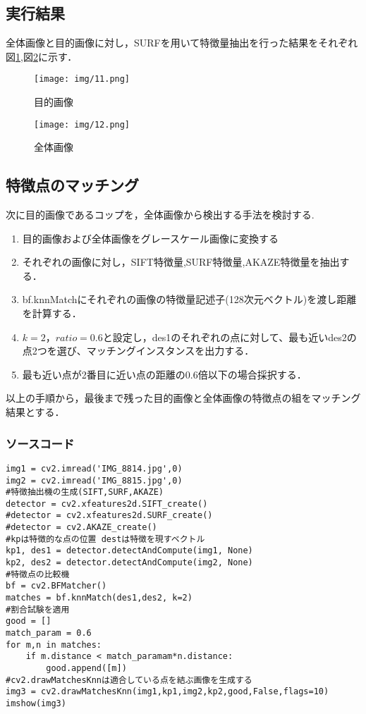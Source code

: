 \documentclass{article}
\begin{document}
\subsection{実行結果}
全体画像と目的画像に対し，SURFを用いて特徴量抽出を行った結果をそれぞれ図\ref{11},図\ref{12}に示す．

\begin{figure}[H]
    \centering
    \texttt{[image: img/11.png]}
    \caption{目的画像}
    \label{11}
\end{figure}

\begin{figure}[H]
    \centering
    \texttt{[image: img/12.png]}
    \caption{全体画像}
    \label{12}
\end{figure}


\subsection{特徴点のマッチング}
次に目的画像であるコップを，全体画像から検出する手法を検討する.

\begin{enumerate}
    \item 目的画像および全体画像をグレースケール画像に変換する
    \item それぞれの画像に対し，SIFT特徴量,SURF特徴量,AKAZE特徴量を抽出する．
    \item bf.knnMatchにそれぞれの画像の特徴量記述子(128次元ベクトル)を渡し距離を計算する．
    \item $k=2$，$ratio=0.6$と設定し，des1のそれぞれの点に対して、最も近いdes2の点2つを選び、マッチングインスタンスを出力する．
    \item 最も近い点が2番目に近い点の距離の0.6倍以下の場合採択する．
\end{enumerate}

以上の手順から，最後まで残った目的画像と全体画像の特徴点の組をマッチング結果とする．

\subsubsection{ソースコード}

\begin{lstlisting}
img1 = cv2.imread('IMG_8814.jpg',0)
img2 = cv2.imread('IMG_8815.jpg',0)
#特徴抽出機の生成(SIFT,SURF,AKAZE)
detector = cv2.xfeatures2d.SIFT_create()
#detector = cv2.xfeatures2d.SURF_create()
#detector = cv2.AKAZE_create()
#kpは特徴的な点の位置 destは特徴を現すベクトル
kp1, des1 = detector.detectAndCompute(img1, None)
kp2, des2 = detector.detectAndCompute(img2, None)
#特徴点の比較機
bf = cv2.BFMatcher()
matches = bf.knnMatch(des1,des2, k=2)
#割合試験を適用
good = []
match_param = 0.6
for m,n in matches:
    if m.distance < match_paramam*n.distance:
        good.append([m])
#cv2.drawMatchesKnnは適合している点を結ぶ画像を生成する
img3 = cv2.drawMatchesKnn(img1,kp1,img2,kp2,good,False,flags=10)
imshow(img3)
\end{lstlisting}
\end{document}
